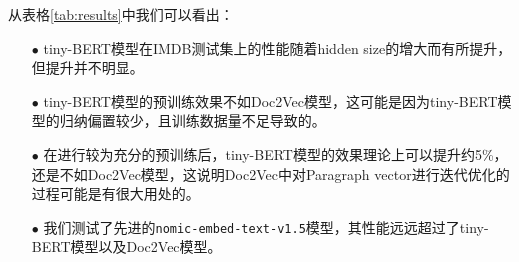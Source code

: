 \documentclass{article}
\begin{document}
从表格\ref{tab:results}中我们可以看出：
\begin{itemize}
  \item[$\bullet$] tiny-BERT模型在IMDB测试集上的性能随着hidden size的增大而有所提升，但提升并不明显。
  \item[$\bullet$] tiny-BERT模型的预训练效果不如Doc2Vec模型，这可能是因为tiny-BERT模型的归纳偏置较少，且训练数据量不足导致的。
  \item[$\bullet$] 在进行较为充分的预训练后，tiny-BERT模型的效果理论上可以提升约5\%，还是不如Doc2Vec模型，这说明Doc2Vec中对Paragraph vector进行迭代优化的过程可能是有很大用处的。
  \item[$\bullet$] 我们测试了先进的\verb|nomic-embed-text-v1.5|模型，其性能远远超过了tiny-BERT模型以及Doc2Vec模型。
\end{itemize}






\end{document}
